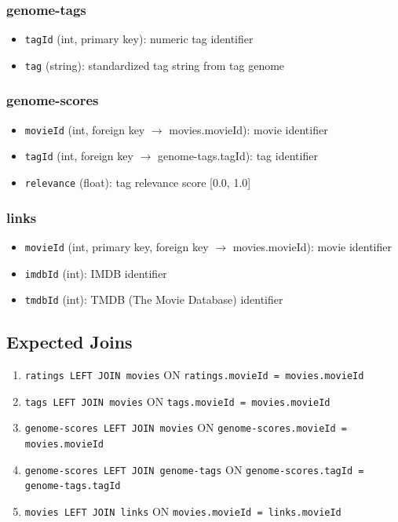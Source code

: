 \documentclass[11pt]{article}
\begin{document}
\subsubsection*{genome-tags}

\begin{itemize}[leftmargin=1.5em]
    \item \texttt{tagId} (int, primary key): numeric tag identifier
    \item \texttt{tag} (string): standardized tag string from tag genome
\end{itemize}

\subsubsection*{genome-scores}

\begin{itemize}[leftmargin=1.5em]
    \item \texttt{movieId} (int, foreign key $\rightarrow$ movies.movieId): movie identifier
    \item \texttt{tagId} (int, foreign key $\rightarrow$ genome-tags.tagId): tag identifier
    \item \texttt{relevance} (float): tag relevance score [0.0, 1.0]
\end{itemize}

\subsubsection*{links}

\begin{itemize}[leftmargin=1.5em]
    \item \texttt{movieId} (int, primary key, foreign key $\rightarrow$ movies.movieId): movie identifier
    \item \texttt{imdbId} (int): IMDB identifier
    \item \texttt{tmdbId} (int): TMDB (The Movie Database) identifier
\end{itemize}

\subsection{Expected Joins}

\begin{enumerate}[leftmargin=1.5em]
    \item \texttt{ratings LEFT JOIN movies} ON \texttt{ratings.movieId = movies.movieId}
    \item \texttt{tags LEFT JOIN movies} ON \texttt{tags.movieId = movies.movieId}
    \item \texttt{genome-scores LEFT JOIN movies} ON \texttt{genome-scores.movieId = movies.movieId}
    \item \texttt{genome-scores LEFT JOIN genome-tags} ON \texttt{genome-scores.tagId = genome-tags.tagId}
    \item \texttt{movies LEFT JOIN links} ON \texttt{movies.movieId = links.movieId}
\end{enumerate}
\end{document}
